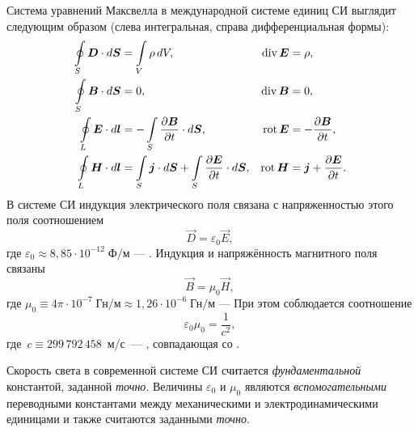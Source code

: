 Система уравнений Максвелла в международной системе единиц СИ выглядит следующим
образом (слева интегральная, справа дифференциальная формы):
\begin{equation}
	\eqmark{maxwell-si}
	\begin{aligned}
		\oint\limits_S\vec{D}\cdot d\vec{S} &= \int\limits_V\rho\,dV,
								& \Div\vec{E} 				&= \rho,
								\\
		\oint\limits_S\vec{B}\cdot d\vec{S} &= 0,
								& \Div\vec{B}				&= 0,
								\\
		\oint\limits_L\vec{E}\cdot d\vec{l} &=
		-\int\limits_S\frac{\partial{\vec{B}}} {\partial t}\cdot d\vec{S}, 							& \Rot\vec{E} 	   			&=
-\frac{\partial\vec B}{\partial t}, \\
		\oint\limits_L\vec{H}\cdot d\vec{l} &=
		\int\limits_S\vec{j}\cdot d\vec{S} +
\int\limits_S\frac{\partial{\vec{E}}}{\partial t}\cdot d\vec{S}, 	& \Rot\vec{H}
&= \vec{j} + \frac{\partial\vec E}{\partial t}.
	\end{aligned}
\end{equation}
В системе СИ индукция электрического поля
связана с напряженностью этого поля соотношением
\begin{equation}
	\vec{D} = \varepsilon_0 \vec{E},
\end{equation}
где $\varepsilon_0 \approx 8,85\cdot10^{-12}\;\text{Ф/м}$ ---
. Индукция и напряжённость магнитного поля
связаны
\begin{equation}
	\vec{B} = \mu_0 \vec{H},
\end{equation}
где $\mu_0 \equiv 4\pi\cdot10^{-7}\;\text{Гн/м} \approx
1,26\cdot10^{-6}\;\text{Гн/м}$ --- 
При этом соблюдается соотношение
\begin{equation}
	\varepsilon_0 \mu_0 = \frac{1}{c^2},
\end{equation}
где~$c\equiv 299\,792\,458$~м/с~--- ,
совпадающая со .

Скорость света в современной системе СИ считается \emph{фундаментальной} константой,
заданной \emph{точно}. Величины $\varepsilon_0$ и $\mu_0$ являются
\emph{вспомогательными} переводными константами между механическими и электродинамическими
единицами и также считаются заданными \emph{точно}.
\todo[inline,color=green]{<-}

